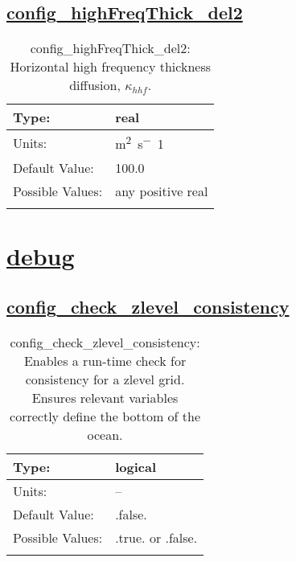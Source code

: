 \subsection[config\_highFreqThick\_del2]{\hyperref[sec:nm_tab_ALE_frequency_filtered_thickness]{config\_highFreqThick\_del2}}
\label{subsec:nm_sec_config_highFreqThick_del2}
\begin{center}
\begin{longtable}{| p{2.0in} || p{4.0in} |}
    \hline
    Type: & real \\
    \hline
    Units: & \si{m^2.s^-1} \\
    \hline
    Default Value: & 100.0 \\
    \hline
    Possible Values: & any positive real \\
    \hline
    \caption{config\_highFreqThick\_del2: Horizontal high frequency thickness diffusion, $\kappa_{hhf}$.}
\end{longtable}
\end{center}
\section[debug]{\hyperref[sec:nm_tab_debug]{debug}}
\label{sec:nm_sec_debug}
\subsection[config\_check\_zlevel\_consistency]{\hyperref[sec:nm_tab_debug]{config\_check\_zlevel\_consistency}}
\label{subsec:nm_sec_config_check_zlevel_consistency}
\begin{center}
\begin{longtable}{| p{2.0in} || p{4.0in} |}
    \hline
    Type: & logical \\
    \hline
    Units: & -- \\
    \hline
    Default Value: & .false. \\
    \hline
    Possible Values: & .true. or .false. \\
    \hline
    \caption{config\_check\_zlevel\_consistency: Enables a run-time check for consistency for a zlevel grid. Ensures relevant variables correctly define the bottom of the ocean.}
\end{longtable}
\end{center}
